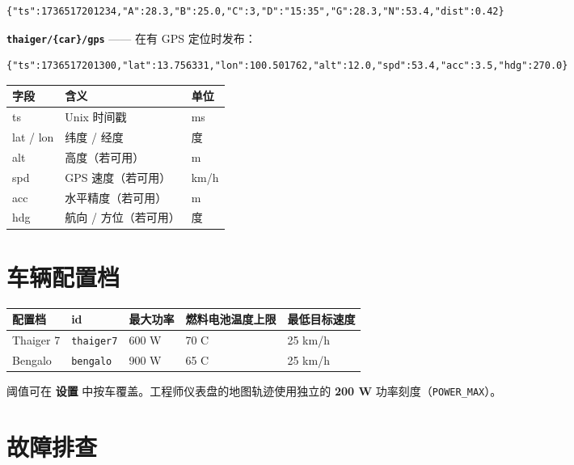 \documentclass[11pt,a4paper,oneside]{report}
\newcommand{\degC}{\textdegree C}
\newcommand{\code}[1]{\texttt{#1}}
\begin{document}
\begin{lstlisting}
{"ts":1736517201234,"A":28.3,"B":25.0,"C":3,"D":"15:35","G":28.3,"N":53.4,"dist":0.42}
\end{lstlisting}
\noindent\textbf{\code{thaiger/\{car\}/gps}} —— 在有 GPS 定位时发布：

\begin{lstlisting}
{"ts":1736517201300,"lat":13.756331,"lon":100.501762,"alt":12.0,"spd":53.4,"acc":3.5,"hdg":270.0}
\end{lstlisting}

\begin{tabularx}{\linewidth}{@{}lLl@{}}
\toprule
\textbf{字段} & \textbf{含义} & \textbf{单位}\\
\midrule
ts & Unix 时间戳 & ms\\
lat / lon & 纬度 / 经度 & 度\\
alt & 高度（若可用） & m\\
spd & GPS 速度（若可用） & km/h\\
acc & 水平精度（若可用） & m\\
hdg & 航向 / 方位（若可用） & 度\\
\bottomrule
\end{tabularx}

\section{车辆配置档}

\begin{tabularx}{\linewidth}{@{}llllL@{}}
\toprule
\textbf{配置档} & \textbf{id} & \textbf{最大功率} & \textbf{燃料电池温度上限} & \textbf{最低目标速度}\\
\midrule
Thaiger 7 & \code{thaiger7} & 600 W & 70 \degC{} & 25 km/h\\
Bengalo & \code{bengalo} & 900 W & 65 \degC{} & 25 km/h\\
\bottomrule
\end{tabularx}

\medskip
阈值可在 \textbf{设置} 中按车覆盖。工程师仪表盘的地图轨迹使用独立的 \textbf{200 W}
功率刻度（\code{POWER\_MAX}）。

\section{故障排查}
\end{document}
